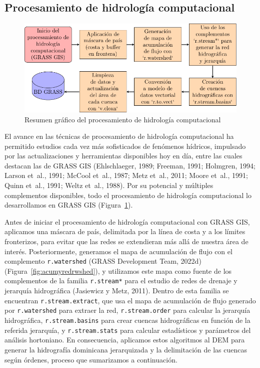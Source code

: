 \documentclass[spanish]{article}
\begin{document}
\hypertarget{procesamiento-de-hidrologuxeda-computacional}{%
\subsection{Procesamiento de hidrología
computacional}\label{procesamiento-de-hidrologuxeda-computacional}}

\begin{figure}

{\centering \includegraphics[width=0.8\linewidth]{figuras/resumen-procesamiento-hidrologia-computacional} 

}

\caption{Resumen gráfico del procesamiento de hidrología computacional}\label{fig:procesamientohidrocompu}
\end{figure}

El avance en las técnicas de procesamiento de hidrología computacional
ha permitido estudios cada vez más sofisticados de fenómenos hídricos,
impulsado por las actualizaciones y herramientas disponibles hoy en día,
entre las cuales destacan las de GRASS GIS (Ehlschlaeger, 1989; Freeman,
1991; Holmgren, 1994; Larson et~al., 1991; McCool et~al., 1987; Metz
et~al., 2011; Moore et~al., 1991; Quinn et~al., 1991; Weltz et~al.,
1988). Por su potencial y múltiples complementos disponibles, todo el
procesamiento de hidrología computacional lo desarrollamos en GRASS GIS
(Figura~\ref{fig:procesamientohidrocompu}).

Antes de iniciar el procesamiento de hidrología computacional con GRASS
GIS, aplicamos una máscara de país, delimitada por la línea de costa y a
los límites fronterizos, para evitar que las redes se extendieran más
allá de nuestra área de interés. Posteriormente, generamos el mapa de
acumulación de flujo con el complemento \texttt{r.watershed} (GRASS
Development Team, 2022d) (Figura~\ref{fig:acumyredrwshed}), y utilizamos
este mapa como fuente de los complementos de la familia
\texttt{r.stream*} para el estudio de redes de drenaje y jerarquía
hidrográfica (Jasiewicz y Metz, 2011). Dentro de esta familia se
encuentran \texttt{r.stream.extract}, que usa el mapa de acumulación de
flujo generado por \texttt{r.watershed} para extraer la red,
\texttt{r.stream.order} para calcular la jerarquía hidrográfica,
\texttt{r.stream.basins} para crear cuencas hidrográficas en función de
la referida jerarquía, y \texttt{r.stream.stats} para calcular
estadísticos y parámetros del análisis hortoniano. En consecuencia,
aplicamos estos algoritmos al DEM para generar la hidrografía dominicana
jerarquizada y la delimitación de las cuencas según órdenes, proceso que
sumarizamos a continuación.
\end{document}
